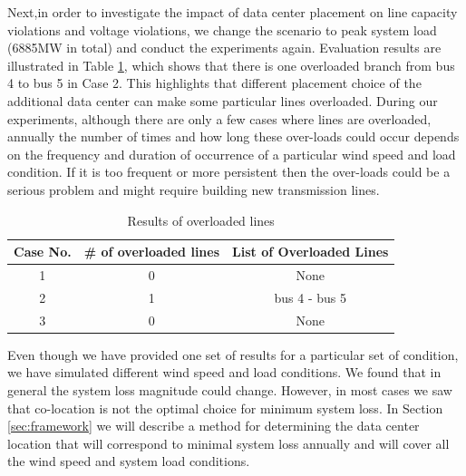 Next,in order to investigate the impact of data center placement on line capacity violations and voltage violations, we change the scenario to peak system load (6885MW in total) and conduct the experiments again. Evaluation results are illustrated in Table \ref{tab:results-linevio}, which shows that there is one overloaded branch from bus 4 to bus 5 in Case 2. This highlights that different placement choice of the additional data center can make some particular lines overloaded. During our experiments, although there are only a few cases where lines are overloaded, annually the number of times and how long these over-loads could occur depends on the frequency and duration of occurrence of a particular wind speed and load condition. If it is too frequent or more persistent then the over-loads could be a serious problem and might require building new transmission lines. 


\begin{table}[ht]
\begin{center}
\caption{Results of overloaded lines}
\begin{tabular}{|c|c|c|}
\hline
Case No. & \# of overloaded lines & List of Overloaded Lines \\
\hline
1 & 0 & None\\
2 & 1 &  bus 4 - bus 5 \\
3 & 0 & None \\

\hline

\end{tabular}
   \vspace{.05in}
\label{tab:results-linevio}
\end{center}
\end{table}

Even though we have provided one set of results for a particular set of condition, we have simulated different wind speed and load conditions. We found that in general the system loss magnitude could change. However, in most cases we saw that co-location is not the optimal choice for minimum system loss. In Section \ref{sec:framework} we will describe a method for determining the data center location that will correspond to minimal system loss annually and will cover all the wind speed and system load conditions.

